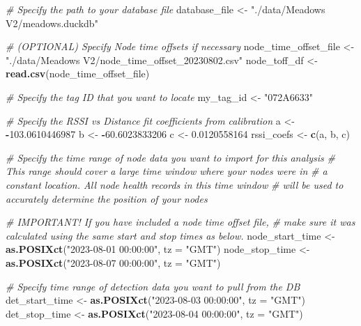 \documentclass[
]{book}
\newenvironment{Shaded}{\begin{snugshade}}{\end{snugshade}}
\newcommand{\AttributeTok}[1]{\textcolor[rgb]{0.13,0.29,0.53}{#1}}
\newcommand{\CommentTok}[1]{\textcolor[rgb]{0.56,0.35,0.01}{\textit{#1}}}
\newcommand{\FloatTok}[1]{\textcolor[rgb]{0.00,0.00,0.81}{#1}}
\newcommand{\FunctionTok}[1]{\textcolor[rgb]{0.13,0.29,0.53}{\textbf{#1}}}
\newcommand{\NormalTok}[1]{#1}
\newcommand{\OtherTok}[1]{\textcolor[rgb]{0.56,0.35,0.01}{#1}}
\newcommand{\SpecialCharTok}[1]{\textcolor[rgb]{0.81,0.36,0.00}{\textbf{#1}}}
\newcommand{\StringTok}[1]{\textcolor[rgb]{0.31,0.60,0.02}{#1}}
\begin{document}
\begin{Shaded}
\begin{Highlighting}[]
\CommentTok{\# Specify the path to your database file}
\NormalTok{database\_file }\OtherTok{\textless{}{-}} \StringTok{"./data/Meadows V2/meadows.duckdb"}

\CommentTok{\# (OPTIONAL) Specify Node time offsets if necessary}
\NormalTok{node\_time\_offset\_file }\OtherTok{\textless{}{-}} \StringTok{"./data/Meadows V2/node\_time\_offset\_20230802.csv"}
\NormalTok{node\_toff\_df }\OtherTok{\textless{}{-}} \FunctionTok{read.csv}\NormalTok{(node\_time\_offset\_file)}

\CommentTok{\# Specify the tag ID that you want to locate}
\NormalTok{my\_tag\_id }\OtherTok{\textless{}{-}} \StringTok{"072A6633"}

\CommentTok{\# Specify the RSSI vs Distance fit coefficients from calibration}
\NormalTok{a }\OtherTok{\textless{}{-}} \SpecialCharTok{{-}}\FloatTok{103.0610446987}
\NormalTok{b }\OtherTok{\textless{}{-}} \SpecialCharTok{{-}}\FloatTok{60.6023833206}
\NormalTok{c }\OtherTok{\textless{}{-}} \FloatTok{0.0120558164}
\NormalTok{rssi\_coefs }\OtherTok{\textless{}{-}} \FunctionTok{c}\NormalTok{(a, b, c)}

\CommentTok{\# Specify the time range of node data you want to import for this analysis}
\CommentTok{\#   This range should cover a large time window where your nodes were in}
\CommentTok{\#   a constant location.  All node health records in this time window}
\CommentTok{\#   will be used to accurately determine the position of your nodes}

\CommentTok{\# IMPORTANT! If you have included a node time offset file,}
\CommentTok{\# make sure it was calculated using the same start and stop times as below.}
\NormalTok{node\_start\_time }\OtherTok{\textless{}{-}} \FunctionTok{as.POSIXct}\NormalTok{(}\StringTok{"2023{-}08{-}01 00:00:00"}\NormalTok{, }\AttributeTok{tz =} \StringTok{"GMT"}\NormalTok{)}
\NormalTok{node\_stop\_time }\OtherTok{\textless{}{-}} \FunctionTok{as.POSIXct}\NormalTok{(}\StringTok{"2023{-}08{-}07 00:00:00"}\NormalTok{, }\AttributeTok{tz =} \StringTok{"GMT"}\NormalTok{)}

\CommentTok{\# Specify time range of detection data you want to pull from the DB}
\NormalTok{det\_start\_time }\OtherTok{\textless{}{-}} \FunctionTok{as.POSIXct}\NormalTok{(}\StringTok{"2023{-}08{-}03 00:00:00"}\NormalTok{, }\AttributeTok{tz =} \StringTok{"GMT"}\NormalTok{)}
\NormalTok{det\_stop\_time }\OtherTok{\textless{}{-}} \FunctionTok{as.POSIXct}\NormalTok{(}\StringTok{"2023{-}08{-}04 00:00:00"}\NormalTok{, }\AttributeTok{tz =} \StringTok{"GMT"}\NormalTok{)}


\end{Highlighting}
\end{Shaded}
\end{document}
